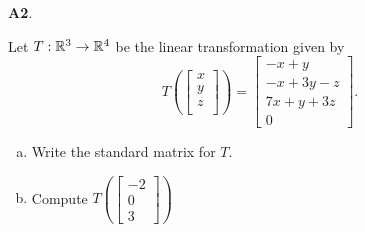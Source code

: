 \documentclass{article}
\newenvironment{problem}[1]
{
  \begin{flushleft}
  \textbf{#1}.
  \ignorespaces
}
{
  \end{flushleft}
}
\begin{document}
\begin{problem}{A2}
Let $T: \mathbb{R}^3\rightarrow \mathbb{R}^4$ be the linear transformation given by $$T\left(\begin{bmatrix} x \\ y \\ z \\  \end{bmatrix} \right) = \begin{bmatrix} -x+y \\ -x+3y-z \\ 7x+y+3z \\ 0 \end{bmatrix}.$$
\begin{enumerate}[(a)]
\item Write the standard matrix for \(T\).
\item Compute \( T\left( \begin{bmatrix} -2 \\ 0 \\ 3 \end{bmatrix} \right) \)
\end{enumerate}
\end{problem}
\end{document}
